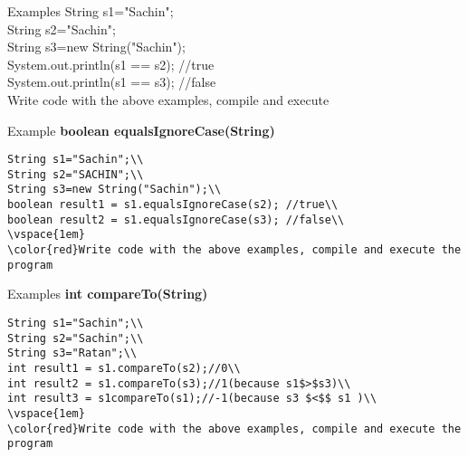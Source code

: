 \documentclass[aspectratio=169,14pt,usenames,dvipsnames]{beamer}
\begin{document}
\begin{frame}{Examples}
String s1="Sachin";\\
String s2="Sachin";\\
String s3=new String("Sachin");\\
System.out.println(s1 == s2); //true\\
System.out.println(s1 == s3); //false\\
\vspace{1em}
\color{red}Write code with the above examples, compile and execute
\end{frame}



\begin{frame}{Example}
\textbf{boolean equalsIgnoreCase(String)}\\
\begin{lstlisting}
String s1="Sachin";\\
String s2="SACHIN";\\
String s3=new String("Sachin");\\
boolean result1 = s1.equalsIgnoreCase(s2); //true\\
boolean result2 = s1.equalsIgnoreCase(s3); //false\\
\vspace{1em}
\color{red}Write code with the above examples, compile and execute the program
\end{lstlisting}
\end{frame}



\begin{frame}{Examples}
\textbf{int compareTo(String)}\\
\begin{lstlisting}
String s1="Sachin";\\
String s2="Sachin";\\
String s3="Ratan";\\
int result1 = s1.compareTo(s2);//0\\
int result2 = s1.compareTo(s3);//1(because s1$>$s3)\\
int result3 = s1compareTo(s1);//-1(because s3 $<$$ s1 )\\
\vspace{1em}
\color{red}Write code with the above examples, compile and execute the program
\end{lstlisting}
\end{frame}
\end{document}
